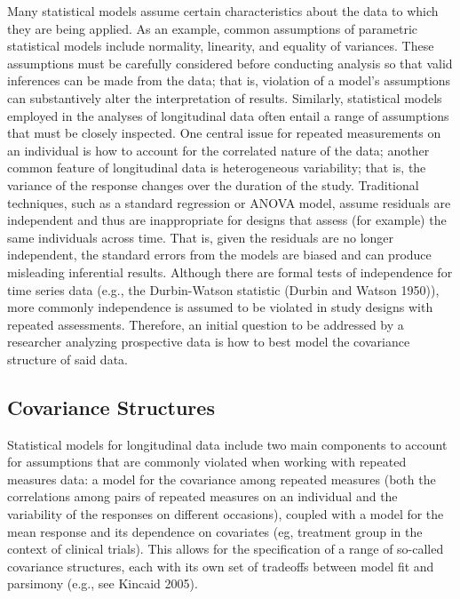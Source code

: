 \documentclass[
  letterpaper,
  DIV=11,
  numbers=noendperiod]{scrartcl}
\begin{document}
Many statistical models assume certain characteristics about the data to
which they are being applied. As an example, common assumptions of
parametric statistical models include normality, linearity, and equality
of variances. These assumptions must be carefully considered before
conducting analysis so that valid inferences can be made from the data;
that is, violation of a model's assumptions can substantively alter the
interpretation of results. Similarly, statistical models employed in the
analyses of longitudinal data often entail a range of assumptions that
must be closely inspected. One central issue for repeated measurements
on an individual is how to account for the correlated nature of the
data; another common feature of longitudinal data is heterogeneous
variability; that is, the variance of the response changes over the
duration of the study. Traditional techniques, such as a standard
regression or ANOVA model, assume residuals are independent and thus are
inappropriate for designs that assess (for example) the same individuals
across time. That is, given the residuals are no longer independent, the
standard errors from the models are biased and can produce misleading
inferential results. Although there are formal tests of independence for
time series data (e.g., the Durbin-Watson statistic (Durbin and Watson
1950)), more commonly independence is assumed to be violated in study
designs with repeated assessments. Therefore, an initial question to be
addressed by a researcher analyzing prospective data is how to best
model the covariance structure of said data.

\hypertarget{covariance-structures}{%
\subsection{Covariance Structures}\label{covariance-structures}}

Statistical models for longitudinal data include two main components to
account for assumptions that are commonly violated when working with
repeated measures data: a model for the covariance among repeated
measures (both the correlations among pairs of repeated measures on an
individual and the variability of the responses on different occasions),
coupled with a model for the mean response and its dependence on
covariates (eg, treatment group in the context of clinical trials). This
allows for the specification of a range of so-called covariance
structures, each with its own set of tradeoffs between model fit and
parsimony (e.g., see Kincaid 2005).
\end{document}
